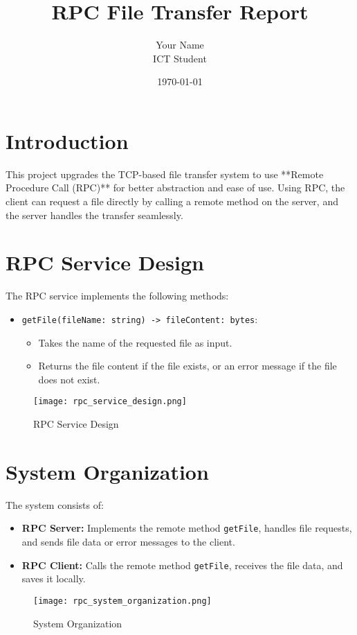 \documentclass[a4paper,12pt]{article}
\title{RPC File Transfer Report}
\author{Your Name \\ ICT Student}
\date{\today}
\begin{document}
\maketitle

\section{Introduction}
This project upgrades the TCP-based file transfer system to use **Remote Procedure Call (RPC)** for better abstraction and ease of use. Using RPC, the client can request a file directly by calling a remote method on the server, and the server handles the transfer seamlessly.

\section{RPC Service Design}
The RPC service implements the following methods:
\begin{itemize}
    \item \texttt{getFile(fileName: string) -> fileContent: bytes}:
    \begin{itemize}
        \item Takes the name of the requested file as input.
        \item Returns the file content if the file exists, or an error message if the file does not exist.
    \end{itemize}
\end{itemize}

\begin{figure}[h!]
    \centering
    \texttt{[image: rpc\_service\_design.png]}
    \caption{RPC Service Design}
    \label{fig:rpc_service}
\end{figure}

\section{System Organization}
The system consists of:
\begin{itemize}
    \item \textbf{RPC Server:} Implements the remote method \texttt{getFile}, handles file requests, and sends file data or error messages to the client.
    \item \textbf{RPC Client:} Calls the remote method \texttt{getFile}, receives the file data, and saves it locally.
\end{itemize}

\begin{figure}[h!]
    \centering
    \texttt{[image: rpc\_system\_organization.png]}
    \caption{System Organization}
    \label{fig:organization}
\end{figure}
\end{document}
